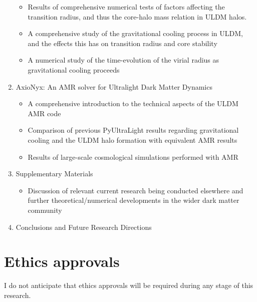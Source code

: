 \begin{enumerate}
        \begin{itemize}
            \item Results of comprehensive numerical tests of factors affecting the transition radius, and thus the core-halo mass relation in ULDM halos.
            \item A comprehensive study of the gravitational cooling process in ULDM, and the effects this has on transition radius and core stability
            \item A numerical study of the time-evolution of the virial radius as gravitational cooling proceeds
        \end{itemize}
    \item AxioNyx: An AMR solver for Ultralight Dark Matter Dynamics
        \begin{itemize}
            \item A comprehensive introduction to the technical aspects of the ULDM AMR code
            \item Comparison of previous PyUltraLight results regarding gravitational cooling and the ULDM halo formation with equivalent AMR results
            \item Results of large-scale cosmological simulations performed with AMR
        \end{itemize}
    \item Supplementary Materials
        \begin{itemize}
            \item Discussion of relevant current research being conducted elsewhere and further theoretical/numerical developments in the wider dark matter community
        \end{itemize}
    \item{Conclusions and Future Research Directions}
\end{enumerate}


\section{Ethics approvals}

I do not anticipate that ethics approvals will be required during any stage of this research. 
